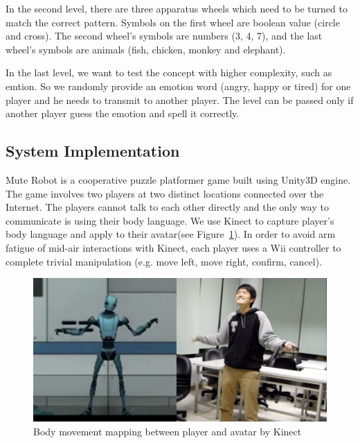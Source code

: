 In the second level, there are three apparatus wheels which need to be turned to match the correct pattern. Symbols on the first wheel are boolean value (circle and cross). The second wheel's symbols are numbers (3, 4, 7), and the last wheel's symbols are animals (fish, chicken, monkey and elephant).


In the last level, we want to test the concept with higher complexity, such as emtion. So we randomly provide an emotion word (angry, happy or tired) for one player and he needs to transmit to another player. The level can be passed only if another player guess the emotion and spell it correctly.

\subsection{System Implementation}


Mute Robot is a cooperative puzzle platformer game built using Unity3D\cite{GD4} engine. The game involves two players at two distinct locations connected over the Internet. The players cannot talk to each other directly and the only way to communicate is using their body language. We use Kinect to capture player's body language and apply to their avatar(see Figure~\ref{fig:GD_F3}). In order to avoid arm fatigue of mid-air interactions\cite{GD6} with Kinect, each player uses a Wii\cite{GD5} controller to complete trivial manipulation (e.g. move left, move right, confirm, cancel).

\begin{figure}[!h]
\centering
\includegraphics[width=0.9\columnwidth]{Figures/GD_F3.png}
\caption{Body movement mapping between player and avatar by Kinect}
\label{fig:GD_F3}
\end{figure}



